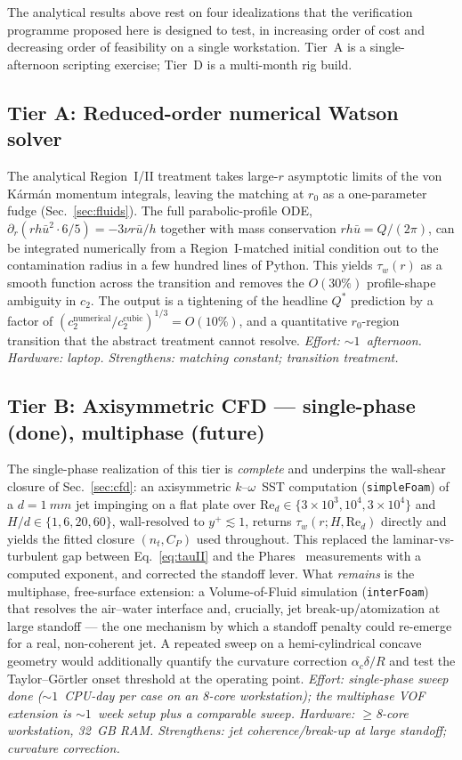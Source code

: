\documentclass[aps,prfluids,reprint,amsmath,amssymb,floatfix]{revtex4-2}
\newcommand{\Rey}{\mathrm{Re}}
\begin{document}
The analytical results above rest on four idealizations that the
verification programme proposed here is designed to test, in increasing
order of cost and decreasing order of feasibility on a single
workstation. Tier~A is a single-afternoon scripting exercise; Tier~D is
a multi-month rig build.

\subsection*{Tier A: Reduced-order numerical Watson solver}
The analytical Region~I/II treatment takes large-$r$ asymptotic limits
of the von K\'arm\'an momentum integrals, leaving the matching at
$r_0$ as a one-parameter fudge (Sec.~\ref{sec:fluids}). The full
parabolic-profile ODE,
$\partial_r(r h \bar u^2 \cdot 6/5) = -3\nu r \bar u / h$
together with mass conservation $r h \bar u = Q/(2\pi)$, can be
integrated numerically from a Region~I-matched initial condition
out to the contamination radius in a few hundred lines of Python.
This yields $\tau_w(r)$ as a smooth function across the transition
and removes the $O(30\%)$ profile-shape ambiguity in $c_2$. The
output is a tightening of the headline $Q^*$ prediction by a factor
of $(c_2^\mathrm{numerical}/c_2^\mathrm{cubic})^{1/3} = O(10\%)$,
and a quantitative $r_0$-region transition that the abstract
treatment cannot resolve.
\textit{Effort: $\sim 1$~afternoon. Hardware: laptop.
Strengthens: matching constant; transition treatment.}

\subsection*{Tier B: Axisymmetric CFD --- single-phase (done), multiphase (future)}
The single-phase realization of this tier is \emph{complete} and underpins the
wall-shear closure of Sec.~\ref{sec:cfd}: an axisymmetric $k$--$\omega$~SST
computation (\texttt{simpleFoam}) of a $d = \SI{1}{mm}$ jet impinging on a flat
plate over $\Rey_d \in \{3\times 10^3, 10^4, 3\times 10^4\}$ and
$H/d \in \{1, 6, 20, 60\}$, wall-resolved to $y^+ \lesssim 1$, returns
$\tau_w(r; H, \Rey_d)$ directly and yields the fitted closure $(n_t, C_P)$ used
throughout. This replaced the laminar-vs-turbulent gap between
Eq.~\eqref{eq:tauII} and the Phares~\citep{Phares2000} measurements with a
computed exponent, and corrected the standoff lever. What \emph{remains} is the
multiphase, free-surface extension: a Volume-of-Fluid simulation
(\texttt{interFoam}) that resolves the air--water interface and, crucially, jet
break-up/atomization at large standoff --- the one mechanism by which a
standoff penalty could re-emerge for a real, non-coherent jet. A repeated sweep
on a hemi-cylindrical concave geometry would additionally quantify the
curvature correction $\alpha_c \delta/R$ and test the Taylor--G\"ortler onset
threshold at the operating point.
\textit{Effort: single-phase sweep done ($\sim 1$~CPU-day per case on an
8-core workstation); the multiphase VOF extension is $\sim 1$~week setup plus a
comparable sweep. Hardware: $\geq$8-core workstation, 32~GB RAM.
Strengthens: jet coherence/break-up at large standoff; curvature correction.}
\end{document}

